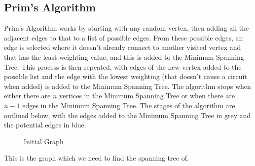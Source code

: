 \subsection{Prim's Algorithm}
Prim's Algorithm works by starting with any random vertex, then adding all the adjacent edges to that to a list of possible edges. From these possible edges, an edge is selected where it doesn't already connect to another visited vertex and that has the least weighting value, and this is added to the Minimum Spanning Tree. This process is then repeated, with edges of the new vertex added to the possible list and the edge with the lowest weighting (that doesn't cause a circuit when added) is added to the Minimum Spanning Tree. The algorithm stops when either there are $n$ vertices in the Minimum Spanning Tree or when there are $n-1$ edges in the Minimum Spanning Tree. The stages of the algorithm are outlined below, with the edges added to the Minimum Spanning Tree in grey and the potential edges in blue. 

\begin{minipage}{0.5\textwidth}
    \begin{figure}[H]
        \centering
        \caption{Initial Graph}
    \end{figure}
\end{minipage} \hfill
\begin{minipage}{0.45\textwidth}
This is the graph which we need to find the spanning tree of.
\end{minipage}

